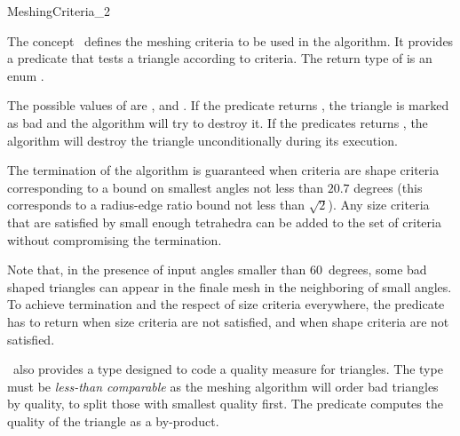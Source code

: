 \begin{ccRefConcept}{MeshingCriteria_2}

\ccDefinition

The concept \ccRefName\ defines the meshing criteria to be used in the
algorithm. It provides a predicate  that tests a triangle
according to criteria. The return type of  is an enum
.

The possible values of  are ,
 and . If the predicate returns ,
the triangle is marked as bad and the algorithm will try to destroy it. If
the predicates returns , the algorithm will destroy
the triangle unconditionally during its execution.

The termination of the algorithm is guaranteed when criteria are shape
criteria corresponding to a bound on smallest angles not less than
$20.7$ degrees (this corresponds to a radius-edge ratio bound not less
than $\sqrt{2}$). Any size criteria that are satisfied by small enough
tetrahedra can be added to the set of criteria without compromising
the termination.

Note that, in the presence of input angles smaller than $60$~degrees,
some bad shaped triangles can appear in the finale mesh in the
neighboring of small angles. To achieve termination and the respect of
size criteria everywhere, the  predicate has to return
 when size criteria are not satisfied, and
 when shape criteria are not satisfied.


\ccRefName\ also provides a type  designed to code a quality
measure for triangles.  The type  must be \emph{less-than
  comparable} as the meshing algorithm will order bad triangles by quality,
to split those with smallest quality first. The predicate 
computes the quality of the triangle as a by-product.

\ccTypes



\end{ccRefConcept}
